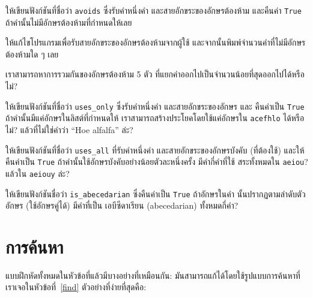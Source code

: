 \begin{exercise} 

ให้เขียนฟังก์ชันที่ชื่อว่า {\tt avoids} ซึ่งรับคำหนึ่งคำ และสายอักขระของอักษรต้องห้าม และคืนค่า {\tt True} ถ้าคำนั้นไม่มีอักษรต้องห้ามที่กำหนดให้เลย

ให้แก้ไขโปรแกรมเพื่อรับสายอักขระของอักษรต้องห้ามจากผู้ใช้ และจากนั้นพิมพ์จำนวนคำที่ไม่มีอักษรต้องห้ามใด ๆ เลย

เราสามารถหาการรวมกันของอักษรต้องห้าม 5 ตัว ที่แยกคำออกไปเป็นจำนวนน้อยที่สุดออกไปได้หรือไม่?

\end{exercise}



\begin{exercise}

ให้เขียนฟังก์ชันที่ชื่อว่า \verb"uses_only" ซึ่งรับคำหนึ่งคำ และสายอักขระของอักษร และ
คืนค่าเป็น {\tt True} ถ้าคำนั้นมีแค่อักษรในลิสต์ที่กำหนดให้ 
เราสามารถสร้างประโยคโดยใช้แค่อักษรใน {\tt acefhlo} ได้หรือไม่? แล้วที่ไม่ใช่คำว่า ``Hoe alfalfa'' ล่ะ?

\end{exercise}


\begin{exercise} 

ให้เขียนฟังก์ชันที่ชื่อว่า \verb"uses_all" ที่รับคำหนึ่งคำ และสายอักขระของอักษรบังคับ (ที่ต้องใช้)
และให้คืนค่าเป็น {\tt True} ถ้าคำนั้นใช้อักษรบังคับอย่างน้อยตัวละหนึ่งครั้ง  มีคำกี่คำที่ใช้
สระทั้งหมดใน {\tt aeiou}? แล้วใน {\tt aeiouy} ล่ะ?

\end{exercise}


\begin{exercise}

ให้เขียนฟังก์ชันชื่อว่า \verb"is_abecedarian" ซึ่งคืนค่าเป็น {\tt True} ถ้าอักษรในคำ
นั้นปรากฏตามลำดับตัวอักษร (ใช้อักษรคู่ได้)
มีคำที่เป็น เอบีซีดาเรียน (abecedarian) ทั้งหมดกี่คำ?

\end{exercise}



\section{การค้นหา} %
\label{search}

แบบฝึกหัดทั้งหมดในหัวข้อที่แล้วมีบางอย่างที่เหมือนกัน: 
มันสามารถแก้ได้โดยใช้รูปแบบการค้นหาที่เราเจอในหัวข้อที่~\ref{find} ตัวอย่างที่ง่ายที่สุดคือ:


